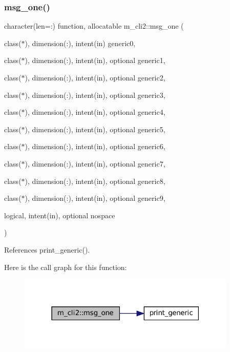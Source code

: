 \subsubsection{\texorpdfstring{msg\+\_\+one()}{msg\_one()}}
{\footnotesize\ttfamily character(len=\+:) function, allocatable m\+\_\+cli2\+::msg\+\_\+one (\begin{DoxyParamCaption}\item[{class($\ast$), dimension(\+:), intent(in)}]{generic0,  }\item[{class($\ast$), dimension(\+:), intent(in), optional}]{generic1,  }\item[{class($\ast$), dimension(\+:), intent(in), optional}]{generic2,  }\item[{class($\ast$), dimension(\+:), intent(in), optional}]{generic3,  }\item[{class($\ast$), dimension(\+:), intent(in), optional}]{generic4,  }\item[{class($\ast$), dimension(\+:), intent(in), optional}]{generic5,  }\item[{class($\ast$), dimension(\+:), intent(in), optional}]{generic6,  }\item[{class($\ast$), dimension(\+:), intent(in), optional}]{generic7,  }\item[{class($\ast$), dimension(\+:), intent(in), optional}]{generic8,  }\item[{class($\ast$), dimension(\+:), intent(in), optional}]{generic9,  }\item[{logical, intent(in), optional}]{nospace }\end{DoxyParamCaption})\hspace{0.3cm}{\ttfamily [private]}}



References print\+\_\+generic().

Here is the call graph for this function\+:\nopagebreak
\begin{figure}[H]
\begin{center}
\leavevmode
\includegraphics[width=295pt]{namespacem__cli2_a368e9aaa556f69228e7f0837bd558b82_cgraph}
\end{center}
\end{figure}
\mbox{\label{namespacem__cli2_a737dc863a63dc101338840baad1cfd17}} 
